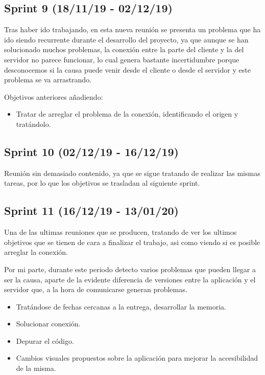 \subsection{Sprint 9 (18/11/19 - 02/12/19)}

Tras haber ido trabajando, en esta nueva reunión se presenta un problema que ha ido siendo recurrente durante el desarrollo del proyecto, ya que aunque se han solucionado muchos problemas, la conexión entre la parte del cliente y la del servidor no parece funcionar, lo cual genera bastante incertidumbre porque desconocemos si la causa puede venir desde el cliente o desde el servidor y este problema se va arrastrando.

Objetivos anteriores añadiendo:

\begin{itemize}
\item Tratar de arreglar el problema de la conexión, identificando el origen y tratándolo.
\end{itemize}

\subsection{Sprint 10 (02/12/19 - 16/12/19)}

Reunión sin demasiado contenido, ya que se sigue tratando de realizar las mismas tareas, por lo que los objetivos se trasladan al siguiente sprint.

\subsection{Sprint 11 (16/12/19 - 13/01/20)}

Una de las ultimas reuniones que se producen, tratando de ver los ultimos objetivos que se tienen de cara a finalizar el trabajo, asi como viendo si es posible arreglar la conexión. 

Por mi parte, durante este periodo detecto varios problemas que pueden llegar a ser la causa, aparte de la evidente diferencia de versiones entre la aplicación y el servidor que, a la hora de comunicarse generan problemas.

\begin{itemize}
\item Tratándose de fechas cercanas a la entrega, desarrollar la memoria.
\item Solucionar conexión.
\item Depurar el código.
\item Cambios visuales propuestos sobre la aplicación para mejorar la accesibilidad de la misma.
\end{itemize}

